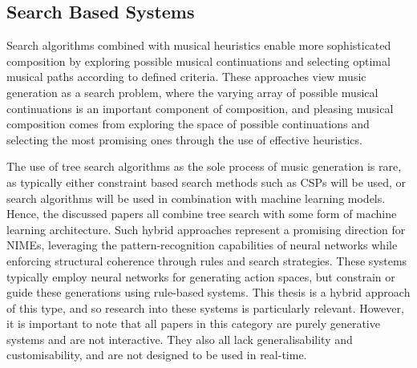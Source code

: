 \subsection{Search Based Systems}
Search algorithms combined with musical heuristics enable more sophisticated composition by exploring possible musical continuations and selecting optimal musical paths according to defined criteria. These approaches view music generation as a search problem, where the varying array of possible musical continuations is an important component of composition, and pleasing musical composition comes from exploring the space of possible continuations and selecting the most promising ones through the use of effective heuristics.

The use of tree search algorithms as the sole process of music generation is rare, as typically either constraint based search methods such as CSPs will be used, or search algorithms will be used in combination with machine learning models. Hence, the discussed papers all combine tree search with some form of machine learning architecture. Such hybrid approaches represent a promising direction for NIMEs, leveraging the pattern-recognition capabilities of neural networks while enforcing structural coherence through rules and search strategies. These systems typically employ neural networks for generating action spaces, but constrain or guide these generations using rule-based systems. This thesis is a hybrid approach of this type, and so research into these systems is particularly relevant. However, it is important to note that all papers in this category are purely generative systems and are not interactive. They also all lack generalisability and customisability, and are not designed to be used in real-time.

